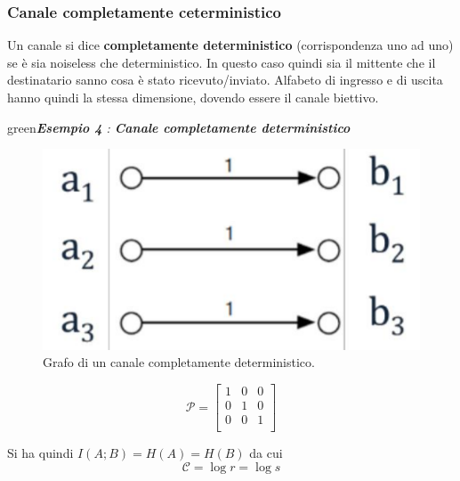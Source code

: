 \subsubsection{Canale completamente ceterministico}
Un canale si dice \textbf{completamente deterministico} (corrispondenza uno ad uno) se è sia noiseless che deterministico. In questo caso quindi sia il mittente che il destinatario sanno cosa \`e stato ricevuto/inviato. Alfabeto di ingresso e di uscita
hanno quindi la stessa dimensione, dovendo essere il canale biettivo.
\begin{mybox}{green}{\textit{\textbf{Esempio 4} : \textbf{Canale completamente deterministico}}}
\begin{minipage}{0.45\textwidth}
\begin{figure}[H]
    \centering
    \includegraphics[scale=0.2]{img/cdet.png}
    \caption{Grafo di un canale completamente deterministico.}
\end{figure}
\end{minipage}
\begin{minipage}{0.45\textwidth}
\begin{equation*}
    \mathcal{P} = \begin{bmatrix}
    1 & 0 & 0 \\
    0 & 1 & 0 \\
    0 & 0 & 1 \\
    \end{bmatrix}
\end{equation*}
\end{minipage}
\end{mybox}
Si ha quindi $I(A;B) = H(A) = H(B)$ da cui 
\begin{equation}
    \mathcal{C} = \log r = \log s
\end{equation}

